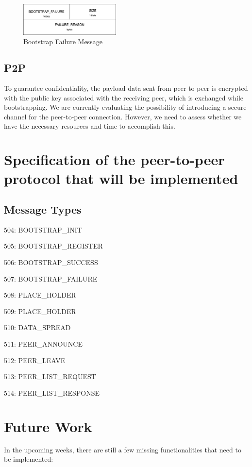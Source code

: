 \begin{figure}[H]
    \centering
    \includegraphics[width=0.45\textwidth]{pics/bootstrap.failure.png}
    \caption{Bootstrap Failure Message}
\end{figure}

\subsection{P2P}

To guarantee confidentiality, the payload data sent from peer to peer is encrypted with the public key associated with the receiving peer, which is exchanged while bootstrapping. We are currently evaluating the possibility of introducing a secure channel for the peer-to-peer connection. However, we need to assess whether we have the necessary resources and time to accomplish this.

\section{Specification of the peer-to-peer protocol that will be implemented}

\subsection{Message Types}

504: BOOTSTRAP\_INIT

505: BOOTSTRAP\_REGISTER

506: BOOTSTRAP\_SUCCESS

507: BOOTSTRAP\_FAILURE


508: PLACE\_HOLDER

509: PLACE\_HOLDER


510: DATA\_SPREAD

511: PEER\_ANNOUNCE

512: PEER\_LEAVE

513: PEER\_LIST\_REQUEST

514: PEER\_LIST\_RESPONSE


\section{Future Work}

In the upcoming weeks, there are still a few missing functionalities that need to be implemented:

